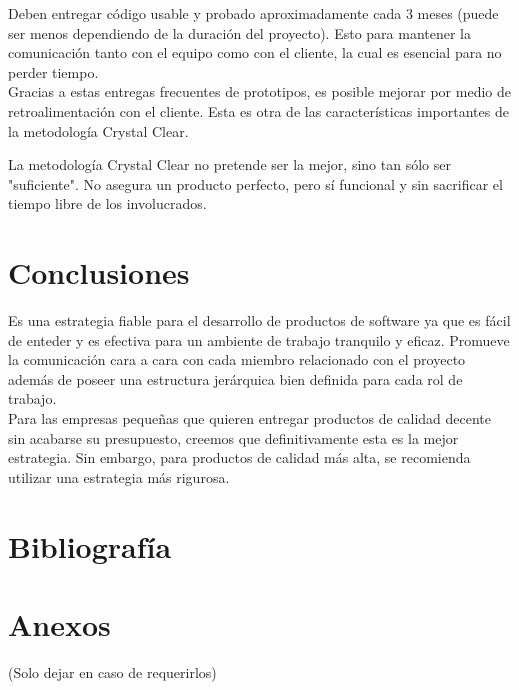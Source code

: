 \documentclass[12pt,a4paper]{article}
\begin{document}
	Deben entregar c\'odigo usable y probado aproximadamente cada 3 meses (puede ser menos dependiendo de la duraci\'on del proyecto). Esto para mantener la comunicaci\'on tanto con el equipo como con el cliente, la cual es esencial para no perder tiempo.\\
	
	Gracias a estas entregas frecuentes de prototipos, es posible mejorar por medio de retroalimentaci\'on con el cliente. Esta es otra de las caracter\'isticas importantes de la metodolog\'ia Crystal Clear.
	
	La metodolog\'ia Crystal Clear no pretende ser la mejor, sino tan s\'olo ser "suficiente". No asegura un producto perfecto, pero s\'i funcional y sin sacrificar el tiempo libre de los involucrados.\\
	
	\section{Conclusiones}
	Es una estrategia fiable para el desarrollo de productos de software ya que es f\'acil de enteder y es efectiva para un ambiente de trabajo tranquilo y eficaz. 
Promueve la comunicaci\'on cara a cara con cada miembro relacionado con el proyecto adem\'as de poseer una estructura jer\'arquica bien definida para cada rol de trabajo.\\
Para las empresas peque\~nas que quieren entregar productos de calidad decente sin acabarse su presupuesto, creemos que definitivamente esta es la mejor estrategia.
Sin embargo, para productos de calidad m\'as alta, se recomienda utilizar una estrategia m\'as rigurosa. 
	
	\section{Bibliografía}
	
	\section{Anexos}
	(Solo dejar en caso de requerirlos)
\end{document}
